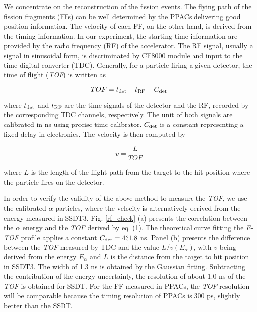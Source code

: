 \documentclass[submitting]{nst}
\begin{document}
We concentrate on the reconstruction of the fission events. The flying path of the fission fragments (FFs) can be well determined by the PPACs delivering good position information. The velocity of each FF, on the other hand, is derived from the timing information. In our experiment, the starting time information are provided by the radio frequency (RF) of the accelerator.   The RF signal, usually a signal in  sinusoidal form, is discriminated by CF8000 module and input to the time-digital-converter (TDC). Generally, for a particle firing a given detector, the time of flight (\textit{TOF}) is written as

\begin{equation}
	TOF = t_{\rm det} - t_{\rm RF} - C_{\rm det}   
\end{equation}

where  $t_{\rm det}$ and $t_{\rm RF}$ are the time signals of the detector and the RF, recorded by the corresponding TDC channels, respectively.  The unit of both signals are calibrated in ns using precise time calibrator.   $C_{\rm det}$  is a constant representing a fixed delay  in electronics. The velocity is then computed by 

\begin{equation}
	v =\frac{L}{TOF}   
\end{equation}

where $L$ is the length of the flight path from the target to the hit position where the particle fires on the detector.

 In order to verify the validity of the above method to measure the \textit{TOF}, we use the calibrated  $\alpha$ particles, where the velocity is alternatively derived from the energy measured in SSDT3.  Fig. \ref{rf_check} (a) presents the correlation between the  $\alpha$ energy and the \textit{TOF} derived by eq. (1). The theoretical curve fitting the  \textit{E-TOF} profile applies a constant $C_{\rm det}=431.8$ ns. Panel (b) presents the difference between the \textit{TOF} measured by TDC and the value $L/v(E_\alpha)$, with $v$ being derived from the energy $E_\alpha$ and $L$ is the distance from the target to  hit position in SSDT3. The width of 1.3 ns  is obtained by the Gaussian fitting. Subtracting the contribution of the energy uncertainty, the resolution  of about 1.0 ns of the \textit{TOF} is  obtained for SSDT. For the  FF measured in PPACs, the \textit{TOF} resolution will be comparable because the timing resolution of PPACs is 300 ps, slightly better than the SSDT.   
\end{document}
